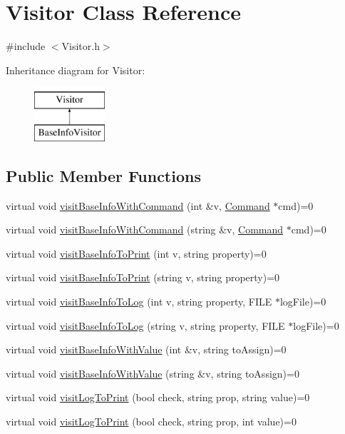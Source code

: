 \hypertarget{classVisitor}{}\section{Visitor Class Reference}
\label{classVisitor}


{\ttfamily \#include $<$Visitor.\+h$>$}

Inheritance diagram for Visitor\+:\begin{figure}[H]
\begin{center}
\leavevmode
\includegraphics[height=2.000000cm]{classVisitor}
\end{center}
\end{figure}
\subsection*{Public Member Functions}
\begin{DoxyCompactItemize}
\item 
virtual void \hyperlink{classVisitor_aa290c4e12905eb700f631b83ce77deea}{visit\+Base\+Info\+With\+Command} (int \&v, \hyperlink{classCommand}{Command} $\ast$cmd)=0
\item 
virtual void \hyperlink{classVisitor_aa6045f028cc91712ab5cca38e1461d39}{visit\+Base\+Info\+With\+Command} (string \&v, \hyperlink{classCommand}{Command} $\ast$cmd)=0
\item 
virtual void \hyperlink{classVisitor_a3d6f39af42e955dcd56d1d928f6edfe2}{visit\+Base\+Info\+To\+Print} (int v, string property)=0
\item 
virtual void \hyperlink{classVisitor_a9f87fbabd6b8cd4d5456d81faff2c31a}{visit\+Base\+Info\+To\+Print} (string v, string property)=0
\item 
virtual void \hyperlink{classVisitor_addcf4dbedba4a2ba739d0fdef144eb6d}{visit\+Base\+Info\+To\+Log} (int v, string property, F\+I\+LE $\ast$log\+File)=0
\item 
virtual void \hyperlink{classVisitor_a591ed3a6edd9b31a8a1b2847c5a22e29}{visit\+Base\+Info\+To\+Log} (string v, string property, F\+I\+LE $\ast$log\+File)=0
\item 
virtual void \hyperlink{classVisitor_a766dd43ac0c15f92b15a5b0fb90deca9}{visit\+Base\+Info\+With\+Value} (int \&v, string to\+Assign)=0
\item 
virtual void \hyperlink{classVisitor_afb85cf66df37046633ef80f085c8c4fe}{visit\+Base\+Info\+With\+Value} (string \&v, string to\+Assign)=0
\item 
virtual void \hyperlink{classVisitor_a3e8e80f88fd9513a971f4db4cde00ef7}{visit\+Log\+To\+Print} (bool check, string prop, string value)=0
\item 
virtual void \hyperlink{classVisitor_ac889258497b1a2c2d673de0ceb3b227b}{visit\+Log\+To\+Print} (bool check, string prop, int value)=0
\end{DoxyCompactItemize}


